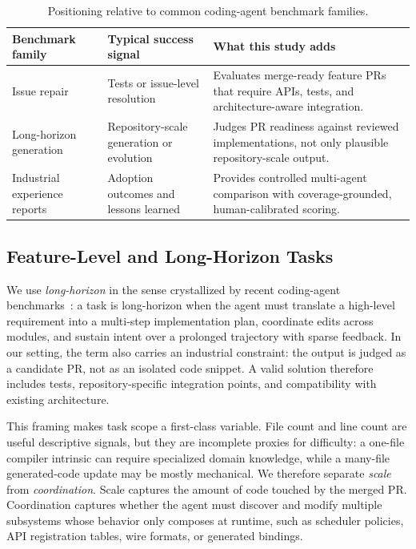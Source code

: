 \begin{table}[t]
\caption{Positioning relative to common coding-agent benchmark families.}
\label{tab:benchmark-positioning}
\centering
\small
\begin{tabularx}{\columnwidth}{@{}YYY@{}}
\toprule
\textbf{Benchmark family} & \textbf{Typical success signal} & \textbf{What this study adds} \\
\midrule
Issue repair & Tests or issue-level resolution & Evaluates merge-ready feature PRs that require APIs, tests, and architecture-aware integration. \\
\midrule
Long-horizon generation & Repository-scale generation or evolution & Judges PR readiness against reviewed implementations, not only plausible repository-scale output. \\
\midrule
Industrial experience reports & Adoption outcomes and lessons learned & Provides controlled multi-agent comparison with coverage-grounded, human-calibrated scoring. \\
\bottomrule
\end{tabularx}
\end{table}

\subsection{Feature-Level and Long-Horizon Tasks}

We use \emph{long-horizon} in the sense crystallized by recent coding-agent benchmarks~\cite{swebenchpro2025,sweevo,featbench2025}: a task is long-horizon when the agent must translate a high-level requirement into a multi-step implementation plan, coordinate edits across modules, and sustain intent over a prolonged trajectory with sparse feedback. In our setting, the term also carries an industrial constraint: the output is judged as a candidate PR, not as an isolated code snippet. A valid solution therefore includes tests, repository-specific integration points, and compatibility with existing architecture.

This framing makes task scope a first-class variable. File count and line count are useful descriptive signals, but they are incomplete proxies for difficulty: a one-file compiler intrinsic can require specialized domain knowledge, while a many-file generated-code update may be mostly mechanical. We therefore separate \emph{scale} from \emph{coordination}. Scale captures the amount of code touched by the merged PR. Coordination captures whether the agent must discover and modify multiple subsystems whose behavior only composes at runtime, such as scheduler policies, API registration tables, wire formats, or generated bindings.

